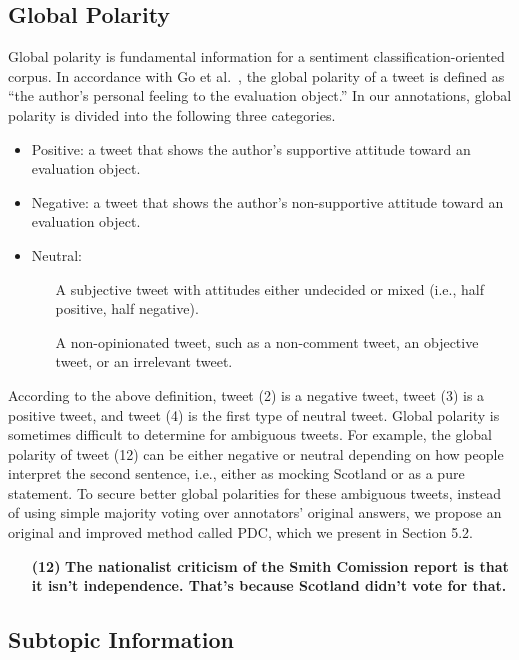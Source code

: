 \documentclass[english]{jnlp_1.4}
\begin{document}
\subsection{Global Polarity}
Global polarity is fundamental information for a sentiment classification-oriented corpus. In accordance with Go et al.\ \citeyear{Go09}, the global polarity of a tweet is defined as ``the author's personal feeling to the evaluation object.'' In our annotations, global polarity is divided into the following three categories.

\begin{itemize}
\item Positive: a tweet that shows the author's supportive attitude toward an evaluation object.
\item Negative: a tweet that shows the author's non-supportive attitude toward an evaluation object.
\item Neutral:
\begin{itemize}
\item[\ding{"AC}] A subjective tweet with attitudes either undecided or mixed (i.e., half positive, half negative).
\item[\ding{"AD}] A non-opinionated tweet, such as a non-comment tweet, an objective tweet, or an irrelevant tweet.
\end{itemize}
\end{itemize}

According to the above definition, tweet (2) is a negative tweet, tweet (3) is a positive tweet, and tweet (4) is the first type of neutral tweet. Global polarity is sometimes difficult to determine for ambiguous tweets. For example, the global polarity of tweet (12) can be either negative or neutral depending on how people interpret the second sentence, i.e., either as mocking Scotland or as a pure statement. To secure better global polarities for these ambiguous tweets, instead of using simple majority voting over annotators' original answers, we propose an original and improved method called PDC, which we present in Section 5.2.
\begin{enumerate}
\item[{\bf (12)}] {\bf The nationalist criticism of the Smith Comission report is that it isn't independence. That's because Scotland didn't vote for that.}
\end{enumerate}

\subsection{Subtopic Information}
\end{document}
